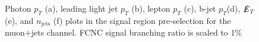 \begin{figure}[h!]
\hfil
{}
\caption{Photon $p_T$ (a), leading light jet $p_T$ (b), lepton $p_T$ (c), b-jet $p_T$(d), $\slashed{E}_T$ (e), and $n_{\text{jets}}$ (f) plots in the signal region pre-selection for the muon+jets channel.  FCNC signal branching ratio is scaled to 1\%}
\label{fig:PreSelPlots3}
\end{figure}

